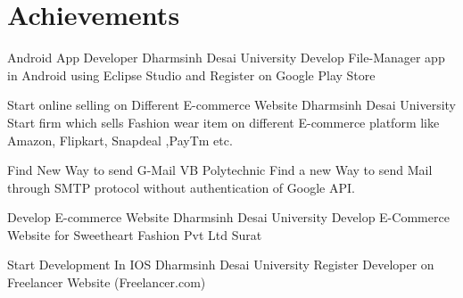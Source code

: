 \documentclass[]{cv-style}          %
\begin{document}

\section{Achievements}

\begin{entrylist}
\entry
{}
{ Android App Developer}
{Dharmsinh Desai University}
{Develop File-Manager app in Android using Eclipse Studio and Register on Google Play Store}

\end{entrylist}
\begin{entrylist}
\entry
{}
{ Start online selling on Different E-commerce Website }
{Dharmsinh Desai University}
{Start firm which sells Fashion wear item on different E-commerce platform like Amazon, Flipkart, Snapdeal ,PayTm etc.}

\end{entrylist}


\begin{entrylist}
\entry
{}
{Find New Way to send G-Mail}
{VB Polytechnic}
{Find a new Way to send Mail through SMTP protocol without authentication of Google API.}

\end{entrylist}

\begin{entrylist}
\entry
{}
{Develop E-commerce Website }
{Dharmsinh Desai University}
{Develop E-Commerce Website for Sweetheart Fashion Pvt Ltd Surat}

\end{entrylist}

\begin{entrylist}
\entry
{}
{Start Development In IOS }
{Dharmsinh Desai University}
{Register Developer on Freelancer Website (Freelancer.com)}

\end{entrylist}\\\\\

\end{document}
